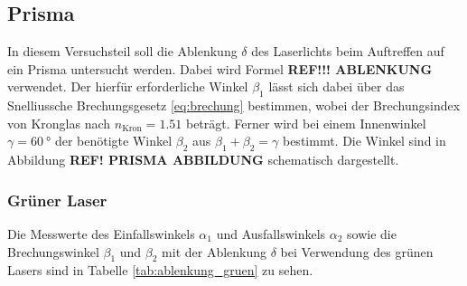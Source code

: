 





\subsection{Prisma}
In diesem Versuchsteil soll die Ablenkung $\delta$ des Laserlichts beim Auftreffen auf ein Prisma untersucht werden.
Dabei wird Formel \textbf{REF!!! ABLENKUNG} verwendet.
Der hierfür erforderliche Winkel $\beta_1$ lässt sich dabei über das Snelliussche Brechungsgesetz \eqref{eq:brechung} bestimmen,
wobei der Brechungsindex von Kronglas nach \cite[]{brechungsindex} $n_\text{Kron} = \num[]{1.51}$ beträgt.
Ferner wird bei einem Innenwinkel $\gamma = \qty[]{60}{\degree}$ der benötigte Winkel $\beta_2$ aus $\beta_1 + \beta_2 = \gamma$ bestimmt.
Die Winkel sind in Abbildung \textbf{REF! PRISMA ABBILDUNG} schematisch dargestellt.

\subsubsection{Grüner Laser}
Die Messwerte des Einfallswinkels $\alpha_1$ und Ausfallswinkels $\alpha_2$ sowie
die Brechungswinkel $\beta_1$ und $\beta_2$ mit der Ablenkung $\delta$ bei Verwendung des grünen Lasers sind in Tabelle \ref{tab:ablenkung_gruen} zu sehen.

